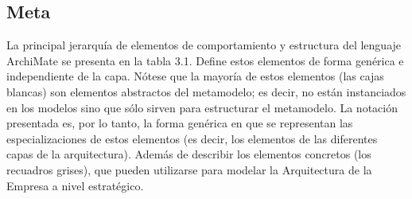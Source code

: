 \subsection{Meta}

La principal jerarquía de elementos de comportamiento y estructura del lenguaje ArchiMate se presenta en la tabla 3.1. Define estos elementos de forma genérica e independiente de la capa. Nótese que la mayoría de estos elementos (las cajas blancas) son elementos abstractos del metamodelo; es decir, no están instanciados en los modelos sino que sólo sirven para estructurar el metamodelo.  La notación presentada es, por lo tanto, la forma genérica en que se representan las especializaciones de estos elementos (es decir, los elementos de las diferentes capas de la arquitectura). Además de describir  los elementos concretos (los recuadros grises), que pueden utilizarse para modelar la Arquitectura de la Empresa a nivel estratégico.

\newpage
